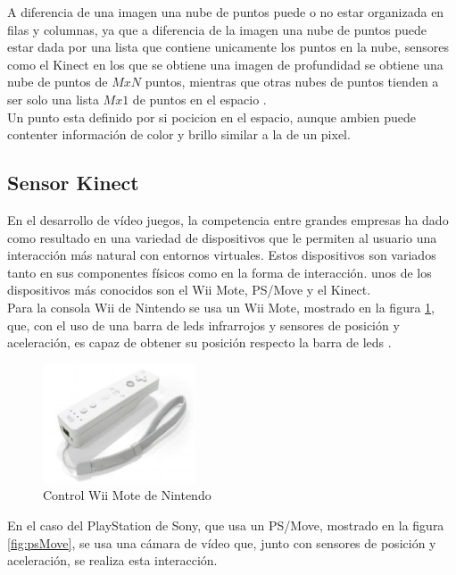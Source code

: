 A diferencia de una \gls{imagen} una nube de puntos puede o no estar organizada en filas y columnas, ya que a diferencia de la imagen una nube de puntos puede estar dada por una lista que contiene unicamente los puntos en la nube, sensores como el Kinect en los que se obtiene una imagen de profundidad se obtiene una nube de puntos de $MxN$ puntos, mientras que otras nubes de puntos tienden a ser solo una lista $Mx1$ de puntos en el espacio \cite{Rusu_ICRA2011_PCL}.\\

Un punto esta definido por si pocicion en el espacio, aunque ambien puede contenter información de color y brillo similar a la de un pixel.

\subsection{Sensor Kinect}

En el desarrollo de vídeo juegos, la competencia entre grandes empresas ha dado como resultado en una variedad de dispositivos que le permiten al usuario una interacción más natural con entornos virtuales. Estos dispositivos son variados tanto en sus componentes físicos como en la forma de interacción. unos de los dispositivos más conocidos son el Wii Mote, PS/Move y el Kinect.\\

Para la consola Wii de Nintendo se usa un Wii Mote, mostrado en la figura \ref{fig:WiiMote}, que, con el uso de una barra de leds infrarrojos y sensores de posición y aceleración, es capaz de obtener su posición respecto la barra de leds \cite{UsodelKi56:online}.\\
\begin{figure}[!htb]
	\centering
	\includegraphics[width=0.4\textwidth]{01Introduccion/imagenes/wiiMote.JPG}
	\caption{Control Wii Mote de Nintendo} 
	\label{fig:WiiMote}
\end{figure}


En el caso del PlayStation de Sony, que usa un PS/Move, mostrado en la figura \ref{fig:psMove}, se usa una cámara de vídeo que, junto con sensores de posición y aceleración, se realiza esta interacción.\\

